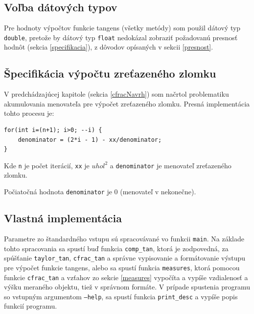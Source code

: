 \documentclass[12pt,a4paper,titlepage,final]{article}
\begin{document}
\subsection{Voľba dátových typov}

Pre hodnoty výpočtov funkcie tangens (všetky metódy) som použil dátový typ \texttt{double}, pretože by dátový typ \texttt{float} nedokázal zobraziť požadovanú presnosť hodnôt (sekcia \ref{specifikacia}), z dôvodov opísaných v sekcii \ref{presnost}.

\subsection{Špecifikácia výpočtu zreťazeného zlomku}

V predchádzajúcej kapitole (sekcia \ref{cfracNavrh}) som načrtol problematiku akumulovania menovateľa pre výpo\-čet zreťazeného zlomku. Presná implementácia tohto procesu je:

\begin{verbatim}
for(int i=(n+1); i>0; --i) {
    denominator = (2*i - 1) - xx/denominator;
}
\end{verbatim}

Kde \texttt{n} je počet iterácií, \texttt{xx} je $uhol^2$ a \texttt{denominator} je menovateľ zreťazeného zlomku.

Počiatočná hodnota \texttt{denominator} je 0 (menovateľ v nekonečne).

\subsection{Vlastná implementácia}

Parametre zo štandardného vstupu sú spracovávané vo funkcii \texttt{main}. Na základe tohto spracovania sa spustí buď funkcia \texttt{comp\_tan}, ktorá je zodpovedná, za spúšťanie \texttt{taylor\_tan}, \texttt{cfrac\_tan} a správne vypisovanie a formátovanie výstupu pre výpočet funkcie tangens, alebo sa spustí funkcia \texttt{measures}, ktorá pomocou funkcie \texttt{cfrac\_tan} a vzťahov zo sekcie \ref{measures} vypočíta a vypíše vzdialenosť a výšku meraného objektu, tiež v správnom formáte. V prípade spustenia programu so vstupným argumentom \texttt{--help}, sa spustí funkcia \texttt{print\_desc} a vypíše popis funkcií programu.
\end{document}
